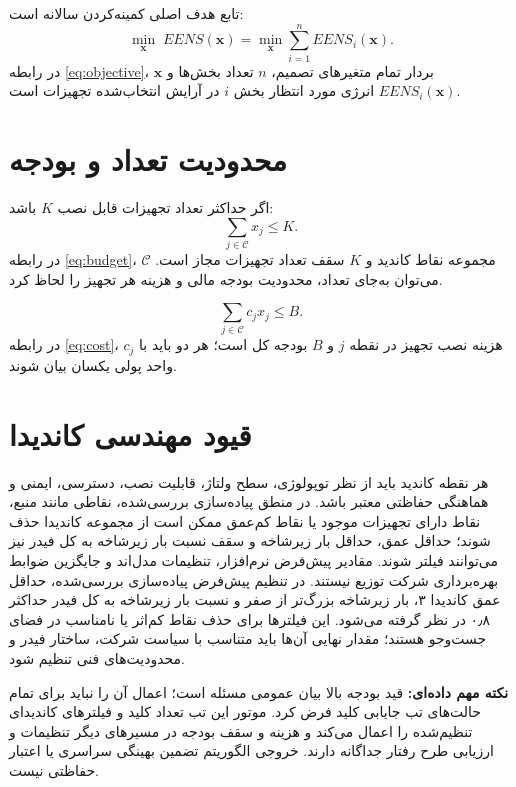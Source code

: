 \documentclass[11pt,a4paper,oneside]{book}
\newcommand{\warn}{\noindent\textbf{نکته مهم داده‌ای:} }
\begin{document}
تابع هدف اصلی کمینه‌کردن  سالانه است:
\begin{equation}
 \min_{\bm{x}}\;EENS(\bm{x})
 =\min_{\bm{x}}\sum_{i=1}^{n}EENS_i(\bm{x}).
 \label{eq:objective}
\end{equation}
در رابطه \eqref{eq:objective}، $\bm{x}$ بردار تمام متغیرهای تصمیم، $n$ تعداد بخش‌ها و $EENS_i(\bm{x})$ انرژی مورد انتظار بخش $i$ در آرایش انتخاب‌شده تجهیزات است.

\section{محدودیت تعداد و بودجه}
اگر حداکثر تعداد تجهیزات قابل نصب $K$ باشد:
\begin{equation}
 \sum_{j\in\mathcal{C}}x_j\le K.
 \label{eq:budget}
\end{equation}
در رابطه \eqref{eq:budget}، $\mathcal{C}$ مجموعه نقاط کاندید و $K$ سقف تعداد تجهیزات مجاز است. می‌توان به‌جای تعداد، محدودیت بودجه مالی و هزینه هر تجهیز را لحاظ کرد.

\begin{equation}
 \sum_{j\in\mathcal{C}}c_jx_j\le B.
 \label{eq:cost}
\end{equation}
در رابطه \eqref{eq:cost}، $c_j$ هزینه نصب تجهیز در نقطه $j$ و $B$ بودجه کل است؛ هر دو باید با واحد پولی یکسان بیان شوند.

\section{قیود مهندسی کاندیدا}
هر نقطه کاندید باید از نظر توپولوژی، سطح ولتاژ، قابلیت نصب، دسترسی، ایمنی و هماهنگی حفاظتی معتبر باشد. در منطق پیاده‌سازی بررسی‌شده، نقاطی مانند منبع، نقاط دارای تجهیزات موجود یا نقاط کم‌عمق ممکن است از مجموعه کاندیدا حذف شوند؛ حداقل عمق، حداقل بار زیرشاخه و سقف نسبت بار زیرشاخه به کل فیدر نیز می‌توانند فیلتر شوند. مقادیر پیش‌فرض نرم‌افزار، تنظیمات مدل‌اند و جایگزین ضوابط بهره‌برداری شرکت توزیع نیستند.
در تنظیم پیش‌فرض پیاده‌سازی بررسی‌شده، حداقل عمق کاندیدا ۳، بار زیرشاخه بزرگ‌تر از صفر و نسبت بار زیرشاخه به کل فیدر حداکثر ۰٫۸ در نظر گرفته می‌شود. این فیلترها برای حذف نقاط کم‌اثر یا نامناسب در فضای جست‌وجو هستند؛ مقدار نهایی آن‌ها باید متناسب با سیاست شرکت، ساختار فیدر و محدودیت‌های فنی تنظیم شود.

\warn قید بودجه بالا بیان عمومی مسئله است؛ اعمال آن را نباید برای تمام حالت‌های تب جایابی کلید فرض کرد. موتور این تب تعداد کلید و فیلترهای کاندیدای تنظیم‌شده را اعمال می‌کند و هزینه و سقف بودجه در مسیرهای دیگر تنظیمات و ارزیابی طرح رفتار جداگانه دارند. خروجی الگوریتم تضمین بهینگی سراسری یا اعتبار حفاظتی نیست.
\end{document}
